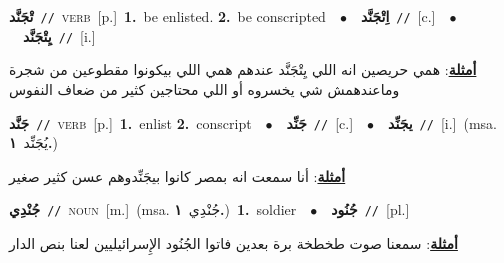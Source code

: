 \documentclass[10pt,a4paper,twoside]{article} %
\begin{document}
\begin{multicols}{2}
{\setlength\topsep{0pt}\textbf{\foreignlanguage{arabic}{تْجَنَّد}}\ {\color{gray}\texttt{//}\color{black}}\ \textsc{verb}\ [p.]\ \textbf{1.}~be enlisted.  \textbf{2.}~be conscripted\ \ $\bullet$\ \ \setlength\topsep{0pt}\textbf{\foreignlanguage{arabic}{اِتْجَنَّد}}\ {\color{gray}\texttt{//}\color{black}}\ [c.]\ \ $\bullet$\ \ \setlength\topsep{0pt}\textbf{\foreignlanguage{arabic}{يِتْجَنَّد}}\ {\color{gray}\texttt{//}\color{black}}\ [i.]\  \begin{flushright}\color{gray}\foreignlanguage{arabic}{\textbf{\underline{\foreignlanguage{arabic}{أمثلة}}}: همي حريصين انه اللي يِتْجَنَّد عندهم همي اللي بيكونوا مقطوعين من شجرة وماعندهمش شي يخسروه أو اللي محتاجين كثير من ضعاف النفوس}\end{flushright}\color{black}} \vspace{2mm}

{\setlength\topsep{0pt}\textbf{\foreignlanguage{arabic}{جَنَّد}}\ {\color{gray}\texttt{//}\color{black}}\ \textsc{verb}\ [p.]\ \textbf{1.}~enlist  \textbf{2.}~conscript\ \ $\bullet$\ \ \setlength\topsep{0pt}\textbf{\foreignlanguage{arabic}{جَنِّد}}\ {\color{gray}\texttt{//}\color{black}}\ [c.]\ \ $\bullet$\ \ \setlength\topsep{0pt}\textbf{\foreignlanguage{arabic}{يجَنِّد}}\ {\color{gray}\texttt{//}\color{black}}\ [i.]\ \color{gray}(msa. \foreignlanguage{arabic}{يُجَنِّد}~\foreignlanguage{arabic}{\textbf{١.}})\color{black}\  \begin{flushright}\color{gray}\foreignlanguage{arabic}{\textbf{\underline{\foreignlanguage{arabic}{أمثلة}}}: أنا سمعت انه بمصر كانوا بيجَنِّدوهم عسن كثير صغير}\end{flushright}\color{black}} \vspace{2mm}

{\setlength\topsep{0pt}\textbf{\foreignlanguage{arabic}{جُنْدِي}}\ {\color{gray}\texttt{//}\color{black}}\ \textsc{noun}\ [m.]\ \color{gray}(msa. \foreignlanguage{arabic}{جُنْدِي}~\foreignlanguage{arabic}{\textbf{١.}})\color{black}\ \textbf{1.}~soldier\ \ $\bullet$\ \ \setlength\topsep{0pt}\textbf{\foreignlanguage{arabic}{جُنُود}}\ {\color{gray}\texttt{//}\color{black}}\ [pl.]\  \begin{flushright}\color{gray}\foreignlanguage{arabic}{\textbf{\underline{\foreignlanguage{arabic}{أمثلة}}}: سمعنا صوت طخطخة برة بعدين فاتوا الجُنُود الإِسرائيليين لعنا بنص الدار}\end{flushright}\color{black}} \vspace{2mm}


\end{multicols}
\end{document}
